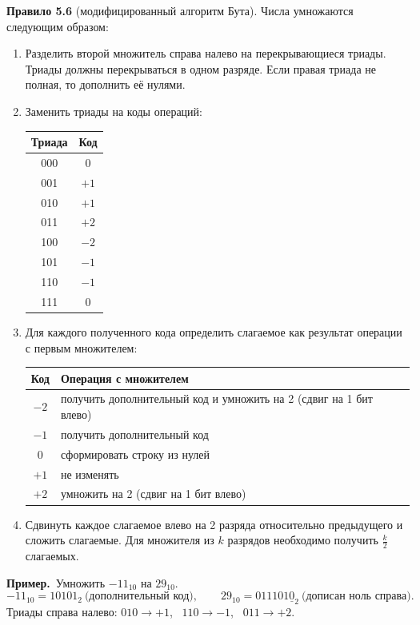 \documentclass[a4paper,11pt]{article}
\newcommand{\prim}{\textbf{Пример.}\ }
\begin{document}
\begin{opr}
\textbf{Правило 5.6} (модифицированный алгоритм Бута). Числа умножаются следующим образом:
\begin{enumerate}[label=\arabic*)]
\item Разделить второй множитель справа налево на перекрывающиеся триады. Триады должны
      перекрываться в одном разряде. Если правая триада не полная, то дополнить её нулями.
\item Заменить триады на коды операций:
\begin{center}
\begin{tabular}{c|c}
  Триада & Код \\ \hline
  000 & $0$ \\
  001 & $+1$ \\
  010 & $+1$ \\
  011 & $+2$ \\
  100 & $-2$ \\
  101 & $-1$ \\
  110 & $-1$ \\
  111 & $0$
\end{tabular}
\end{center}
\item Для каждого полученного кода определить слагаемое как результат операции с первым множителем:
\begin{center}
\begin{tabular}{c|p{10cm}}
  Код & Операция с множителем \\ \hline
  $-2$ & получить дополнительный код и умножить на 2 (сдвиг на 1 бит влево) \\
  $-1$ & получить дополнительный код \\
  $0$  & сформировать строку из нулей \\
  $+1$ & не изменять \\
  $+2$ & умножить на 2 (сдвиг на 1 бит влево)
\end{tabular}
\end{center}
\item Сдвинуть каждое слагаемое влево на 2 разряда относительно предыдущего и сложить слагаемые.
      Для множителя из $k$ разрядов необходимо получить $\frac{k}{2}$ слагаемых.
\end{enumerate}
\end{opr}

\prim Умножить $-11_{10}$ на $29_{10}$.
\[
  -11_{10} = 10101_2 \ \text{(дополнительный код)}, \qquad
  29_{10} = 011101\underline{0}_2 \ \text{(дописан ноль справа)}.
\]
Триады справа налево: $010 \to +1$, \ $110 \to -1$, \ $011 \to +2$.
\end{document}
